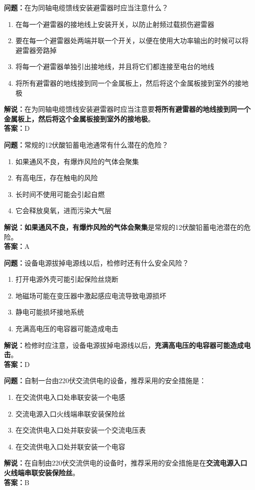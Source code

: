 \noindent\textbf{问题：}在为同轴电缆馈线安装避雷器时应当注意什么？
\begin{enumerate}[label=\Alph*), leftmargin=3em]
	\item 在每一个避雷器的接地线上安装开关，以防止射频过载损伤避雷器
	\item 要在每一个避雷器处两端并联一个开关，以便在使用大功率输出的时候可以将避雷器旁路掉
	\item 将每一个避雷器单独引出接地线，并且将它们都连接至电台的地线
	\item 将所有避雷器的地线接到同一个金属板上，然后将这个金属板接到室外的接地极
\end{enumerate}
\noindent\textbf{解说：}在为同轴电缆馈线安装避雷器时应当注意要\textbf{将所有避雷器的地线接到同一个金属板上，然后将这个金属板接到室外的接地极}。\\\noindent\textbf{答案：}D

\bigskip


\noindent\textbf{问题：}常规的12伏酸铅蓄电池通常有什么潜在的危险？
\begin{enumerate}[label=\Alph*), leftmargin=3em]
	\item 如果通风不良，有爆炸风险的气体会聚集
	\item 有高电压，存在触电的风险
	\item 长时间不使用可能会引起自燃
	\item 它会释放臭氧，进而污染大气层
\end{enumerate}
\noindent\textbf{解说：}\textbf{如果通风不良，有爆炸风险的气体会聚集}是常规的12伏酸铅蓄电池潜在的危险。\\\noindent\textbf{答案：}A

\bigskip


\noindent\textbf{问题：}设备电源拔掉电源线以后，检修时还有什么安全风险？
\begin{enumerate}[label=\Alph*), leftmargin=3em]
	\item 打开电源外壳可能引起保险丝烧断
	\item 地磁场可能在变压器中激起感应电流导致电源损坏
	\item 静电可能损坏接地系统
	\item 充满高电压的电容器可能造成电击
\end{enumerate}
\noindent\textbf{解说：}检修时应注意，设备电源拔掉电源线以后，\textbf{充满高电压的电容器可能造成电击}。\\\noindent\textbf{答案：}D

\bigskip


\noindent\textbf{问题：}自制一台由220伏交流供电的设备，推荐采用的安全措施是：
\begin{enumerate}[label=\Alph*), leftmargin=3em]
	\item 在交流供电入口处串联安装一个电感
	\item 交流电源入口火线端串联安装保险丝
	\item 在交流供电入口处并联安装一个交流电压表
	\item 在交流供电入口处并联安装一个电容
\end{enumerate}
\noindent\textbf{解说：}在自制由220伏交流供电的设备时，推荐采用的安全措施是在\textbf{交流电源入口火线端串联安装保险丝}。\\\noindent\textbf{答案：}B

